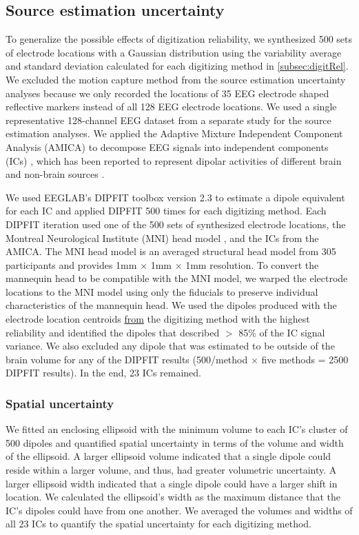 \documentclass[../thesis_seyed.tex]{subfiles}
\begin{document}
\subsection{Source estimation uncertainty}
\label{subsec:soEst}
To generalize the possible effects of digitization reliability, we synthesized 500 sets of electrode locations with a Gaussian distribution using the variability average and standard deviation calculated for each digitizing method in \ref{subsec:digitRel}. We excluded the motion capture method from the source estimation uncertainty analyses because we only recorded the locations of 35 EEG electrode shaped reflective markers instead of all 128 EEG electrode locations. 
We used a single representative 128-channel EEG dataset from a separate study for the source estimation analyses. We applied the Adaptive Mixture Independent Component Analysis (AMICA) to decompose EEG signals into independent components (ICs) \cite{Palmer2007-sv}, which has been reported to represent dipolar activities of different brain and non-brain sources \cite{Delorme2012-re}. 

We used EEGLAB's DIPFIT toolbox version 2.3 to estimate a dipole equivalent for each IC and applied DIPFIT 500 times for each digitizing method. Each DIPFIT iteration used one of the 500 sets of synthesized electrode locations, the Montreal Neurological Institute (MNI) head model \cite{Evans1993-nx}, and the ICs from the AMICA. The MNI head model is an averaged structural head model from 305 participants and provides 1mm $\times$ 1mm $\times$ 1mm resolution. To convert the mannequin head to be compatible with the MNI model, we warped the electrode locations to the MNI model using only the fiducials to preserve individual characteristics of the mannequin head. We used the dipoles produced with the electrode location centroids \ul{from} the digitizing method with the highest reliability and identified the dipoles that described $>$ 85\% of the IC signal variance. We also excluded any dipole that was estimated to be outside of the brain volume for any of the DIPFIT results (500/method $\times$ five methods = 2500 DIPFIT results). In the end, 23 ICs remained.  

\subsubsection{Spatial uncertainty}
We fitted an enclosing ellipsoid with the minimum volume to each IC's cluster of 500 dipoles \cite{Moshtagh2005-em} and quantified spatial uncertainty in terms of the volume and width of the ellipsoid. A larger ellipsoid volume indicated that a single dipole could reside within a larger volume, and thus, had greater volumetric uncertainty. A larger ellipsoid width indicated that a single dipole could have a larger shift in location. We calculated the ellipsoid's width as the maximum distance that the IC's dipoles could have from one another. We averaged the volumes and widths of all 23 ICs to quantify the spatial uncertainty for each digitizing method. 
    
\end{document}
